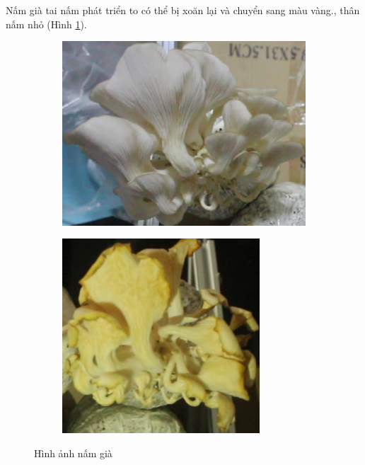 Nấm già tai nấm phát triển to có thể bị xoăn lại và chuyển sang màu vàng., thân nấm nhỏ (Hình \ref{fig:old}).
\begin{figure}[H]
    \centering
    \begin{subfigure}{.5\textwidth}
        \includegraphics[width=0.85\linewidth]{images/old1.png}
    \end{subfigure}%
    \begin{subfigure}{.5\textwidth}
        \includegraphics[width=0.85\linewidth]{images/old3.png}
    \end{subfigure}
    \caption{Hình ảnh nấm già}
    \label{fig:old}
\end{figure}

